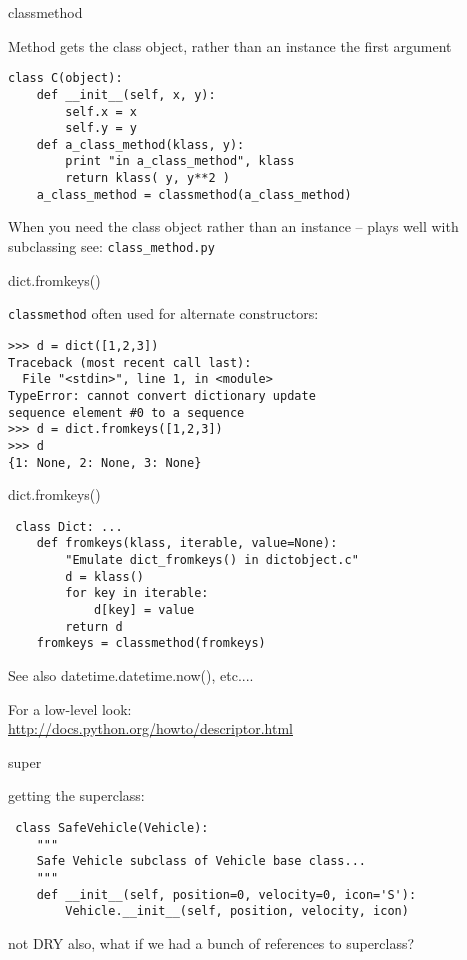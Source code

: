 \documentclass{beamer}
\begin{document}
\begin{frame}[fragile]{classmethod}

{ \Large Method gets the class object, rather than an instance the first argument}

\begin{verbatim}
class C(object):
    def __init__(self, x, y):
        self.x = x
        self.y = y
    def a_class_method(klass, y):
        print "in a_class_method", klass
        return klass( y, y**2 )
    a_class_method = classmethod(a_class_method)
\end{verbatim}
{\Large When you need the class object rather than an instance -- plays well with subclassing}
\vfill
see: \verb|class_method.py|
\end{frame} 

\begin{frame}[fragile]{dict.fromkeys()}

{ \Large \verb|classmethod| often used for alternate constructors:}

\begin{verbatim}
>>> d = dict([1,2,3])
Traceback (most recent call last):
  File "<stdin>", line 1, in <module>
TypeError: cannot convert dictionary update
sequence element #0 to a sequence
>>> d = dict.fromkeys([1,2,3])
>>> d
{1: None, 2: None, 3: None}
\end{verbatim}

\end{frame} 

\begin{frame}[fragile]{dict.fromkeys()}

\begin{verbatim}
￼class Dict: ...
    def fromkeys(klass, iterable, value=None):
        "Emulate dict_fromkeys() in dictobject.c"
        d = klass()
        for key in iterable:
            d[key] = value
        return d
    fromkeys = classmethod(fromkeys)
\end{verbatim}

\vfill
{\Large See also datetime.datetime.now(), etc....}

\vfill
For a low-level look:\\
\url{http://docs.python.org/howto/descriptor.html}

\end{frame} 

\begin{frame}[fragile]{super}

{\Large getting the superclass:}
\begin{verbatim}
￼class SafeVehicle(Vehicle):
    """
    Safe Vehicle subclass of Vehicle base class...
    """
    def __init__(self, position=0, velocity=0, icon='S'):
        Vehicle.__init__(self, position, velocity, icon)
\end{verbatim}

{\Large
\vfill
not DRY
\vfill
also, what if we had a bunch of references to superclass?
}
\end{frame} 
\end{document}
